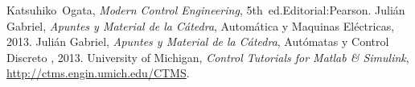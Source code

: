 \documentclass[journal]{IEEEtran}
\begin{document}





\ifCLASSOPTIONcaptionsoff
  \newpage
\fi





%
%
%
\begin{thebibliography}{1}

\bibitem{}
Katsuhiko~Ogata, \emph{Modern Control Engineering}, 5th~ed.\relax Editorial:Pearson.
\bibitem{}
Julián Gabriel, \emph{Apuntes y Material de la Cátedra},
\relax Automática y Maquinas Eléctricas, 2013.
\bibitem{}
Julián Gabriel, \emph{Apuntes y Material de la Cátedra},
\relax Autómatas y Control Discreto , 2013.
\bibitem{}
University of Michigan, \emph{Control Tutorials for Matlab \& Simulink},\\
\relax \url{http://ctms.engin.umich.edu/CTMS}.
\end{thebibliography}
\end{document}
